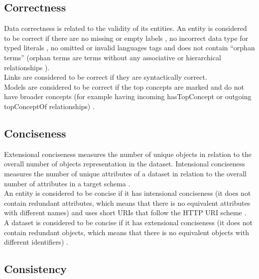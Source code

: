 \documentclass[onecolumn, crcready]{iosart2c}
\begin{document}
\subsection{Correctness}

Data correctness is related to the validity of its entities. An entity is considered to be correct if there are no missing or empty labels \cite{Acosta2013}\cite{Mader2012}, no incorrect data type for typed literals \cite{Hogan2010}\cite{Acosta2013}, no omitted or invalid languages tags \cite{Suominen:2012:IQS:2413941.2413985}\cite{Mader2012} and does not contain ``orphan terms'' (orphan terms are terms without any associative or hierarchical relationships \cite{journals/ires/Living10}).\\ Links are considered to be correct if they are syntactically correct. \\ Models are considered to be correct if the top concepts are marked and do not have broader concepts (for example having incoming hasTopConcept or outgoing topConceptOf relationships) \cite{Mader2012}.

\subsection{Conciseness}

Extensional conciseness measures the number of unique objects in relation to the overall number of objects representation in the dataset. Intensional conciseness measures the number of unique attributes of a dataset in relation to the overall number of attributes in a target schema \cite{ Bleiholder:2009}. \\ An entity is considered to be concise if it has intensional conciseness (it does not contain redundant attributes, which means that there is no equivalent attributes with different names) \cite{Mendes2012} and uses short URIs \cite{Framework2012} that follow the HTTP URI scheme \cite{Hogan:2012:ESL:2263498.2264570}\cite{Suominen2013}.\\ A dataset is considered to be concise if it has extensional conciseness (it does not contain redundant objects, which means that there is no equivalent objects with different identifiers) \cite{Mendes2012}.

\subsection{Consistency}
\end{document}
